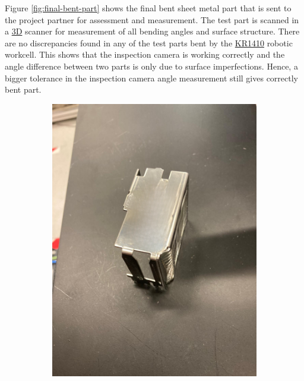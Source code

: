 Figure \ref{fig:final-bent-part} shows the final bent sheet metal part that is sent to the project partner for assessment and measurement. The test part is scanned in a \hyperref[acro:3D]{3D} scanner for measurement of all bending angles and surface structure. There are no discrepancies found in any of the test parts bent by the \hyperref[acro:KR]{KR1410} robotic workcell. This shows that the inspection camera is working correctly and the angle difference between two parts is only due to surface imperfections. Hence, a bigger tolerance in the inspection camera angle measurement still gives correctly bent part.

\begin{figure}[h]
    \centering
    \begin{subfigure}{0.48\textwidth}
        \centering
        \includegraphics[width=\textwidth]{figures/bending/final-part02.png}
        \caption{}
        \label{subfig:final-part1}
        \vspace{0.5cm}

\end{subfigure}
\end{figure}
